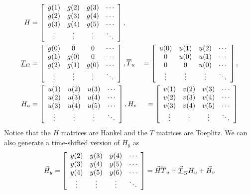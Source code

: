 \documentclass[lecture,12pt,]{pcms-l}
\begin{document}
\begin{align*}
H &= \left[\begin{array}{c c c c}
g(1) & g(2) & g(3) & \cdots \\
g(2) & g(3) & g(4) & \cdots \\
g(3) & g(4) & g(5) & \cdots \\
\vdots & \vdots & \vdots & \ddots
\end{array}\right], \\
\underline{T}_G &= \left[\begin{array}{c c c c}
g(0) & 0 & 0 & \cdots \\
g(1) & g(0) & 0 & \cdots \\
g(2) & g(1) & g(0) & \cdots \\
\vdots & \vdots & \vdots & \ddots
\end{array}\right], \hfill
\overline{T}_u &= \left[\begin{array}{c c c c}
u(0) & u(1) & u(2) & \cdots \\
0 & u(0) & u(1) & \cdots \\
0 & 0 & u(0) & \cdots \\
\vdots & \vdots & \vdots & \ddots
\end{array}\right], \\
H_u &= \left[\begin{array}{c c c c}
u(1) & u(2) & u(3) & \cdots \\
u(2) & u(3) & u(4) & \cdots \\
u(3) & u(4) & u(5) & \cdots \\
\vdots & \vdots & \vdots & \ddots
\end{array}\right], \hfill
H_v &= \left[\begin{array}{c c c c}
v(1) & v(2) & v(3) & \cdots \\
v(2) & v(3) & v(4) & \cdots \\
v(3) & v(4) & v(5) & \cdots \\
\vdots & \vdots & \vdots & \ddots
\end{array}\right]
\end{align*}
Notice that the $H$ matrices are Hankel and the $T$ matrices are Toeplitz. We can also generate a time-shifted version of $H_y$ as
\begin{align*}
\vec{H}_y = \left[\begin{array}{c c c c}
y(2) & y(3) & y(4) & \cdots \\
y(3) & y(4) & y(5) & \cdots \\
y(4) & y(5) & y(6) & \cdots \\
\vdots & \vdots & \vdots & \ddots
\end{array}\right]
= \vec{H}\overline{T}_u + \vec{\underline{T}}_GH_u + \vec{H}_v
\end{align*}
\end{document}
